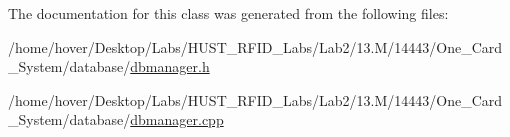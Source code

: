 The documentation for this class was generated from the following files\+:\begin{DoxyCompactItemize}
\item 
/home/hover/\+Desktop/\+Labs/\+H\+U\+S\+T\+\_\+\+R\+F\+I\+D\+\_\+\+Labs/\+Lab2/13.\+M/14443/\+One\+\_\+\+Card\+\_\+\+System/database/\mbox{\hyperlink{dbmanager_8h}{dbmanager.\+h}}\item 
/home/hover/\+Desktop/\+Labs/\+H\+U\+S\+T\+\_\+\+R\+F\+I\+D\+\_\+\+Labs/\+Lab2/13.\+M/14443/\+One\+\_\+\+Card\+\_\+\+System/database/\mbox{\hyperlink{dbmanager_8cpp}{dbmanager.\+cpp}}\end{DoxyCompactItemize}

